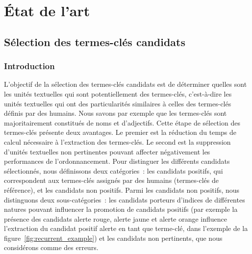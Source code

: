 \part{État de l'art}
\label{part:main-state_of_the_art}


  \chapter{Sélection des termes-clés candidats}
  \label{chap:main-state_of_the_art-keyphrase_candidate_selection}
    \section{Introduction}
    \label{sec:main-state_of_the_art-keyphrase_candidate_selection-introduction}
      L'objectif de la sélection des termes-clés candidats est de déterminer
      quelles sont les unités textuelles qui sont potentiellement des
      termes-clés, c'est-à-dire les unités textuelles qui ont des particularités
      similaires à celles des termes-clés définis par des humains. Nous savons
      par exemple que les termes-clés sont majoritairement constitués de noms et
      d'adjectifs. Cette étape de sélection des termes-clés présente deux
      avantages. Le premier est la réduction du temps de calcul nécessaire à
      l'extraction des  termes-clés. Le second est la suppression d'unités
      textuelles non pertinentes pouvant affecter négativement les performances
      de l'ordonnancement. Pour distinguer les différents candidats
      sélectionnés, nous définissons deux catégories~: les candidats positifs,
      qui correspondent aux termes-clés assignés par des humains (termes-clés de
      référence), et les candidats non positifs. Parmi les candidats non
      positifs, nous distinguons deux sous-catégories~: les candidats porteurs
      d'indices de différentes natures pouvant influencer la promotion de
      candidats positifs (par exemple la présence des candidats \og{}alerte
      rouge\fg{}, \og{}alerte jaune\fg{} et \og{}alerte orange\fg{} influence
      l'extraction du candidat positif \og{}alerte\fg{} en tant que terme-clé,
      dans l'exemple de la figure~\ref{fig:recurrent_example}) et les candidats
      non pertinents, que nous considérons comme des erreurs.

